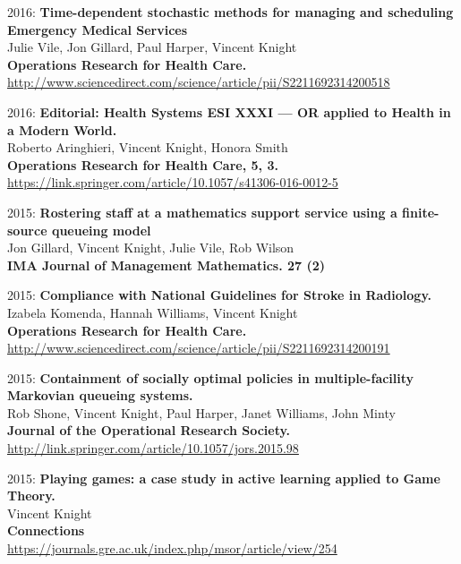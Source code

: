 \documentclass[10pt]{res} %
\begin{document}
\begin{resume}
\begin{etaremune}
\item
2016: \textbf{Time-dependent stochastic methods for managing and scheduling Emergency Medical Services}\\
Julie Vile, Jon Gillard, Paul Harper, Vincent Knight
\\
\textbf{Operations Research for Health Care.}
\\
\url{http://www.sciencedirect.com/science/article/pii/S2211692314200518}
\\

\item
2016: \textbf{Editorial: Health Systems ESI XXXI — OR applied to Health in a Modern World.}\\
Roberto Aringhieri, Vincent Knight, Honora Smith
\\
\textbf{Operations Research for Health Care, 5, 3.}
\\
\url{https://link.springer.com/article/10.1057/s41306-016-0012-5}
\\

\item
2015: \textbf{Rostering staff at a mathematics support service using a finite-source queueing model}\\
Jon Gillard, Vincent Knight, Julie Vile, Rob Wilson
\\
\textbf{IMA Journal of Management Mathematics. 27 (2)}
\\

\item
2015: \textbf{Compliance with National Guidelines for Stroke in Radiology.}\\
Izabela Komenda, Hannah Williams, Vincent Knight
\\
\textbf{Operations Research for Health Care.}
\\
\url{http://www.sciencedirect.com/science/article/pii/S2211692314200191}
\\

\item
2015: \textbf{Containment of socially optimal policies in multiple-facility Markovian queueing systems.}\\
Rob Shone, Vincent Knight, Paul Harper, Janet Williams, John Minty
\\
\textbf{Journal of the Operational Research Society.}
\\
\url{http://link.springer.com/article/10.1057/jors.2015.98}
\\

\item
2015: \textbf{Playing games: a case study in active learning applied to Game Theory.}\\
Vincent Knight
\\
\textbf{Connections}
\\
\url{https://journals.gre.ac.uk/index.php/msor/article/view/254}
\\


\end{etaremune}
\end{resume}
\end{document}
